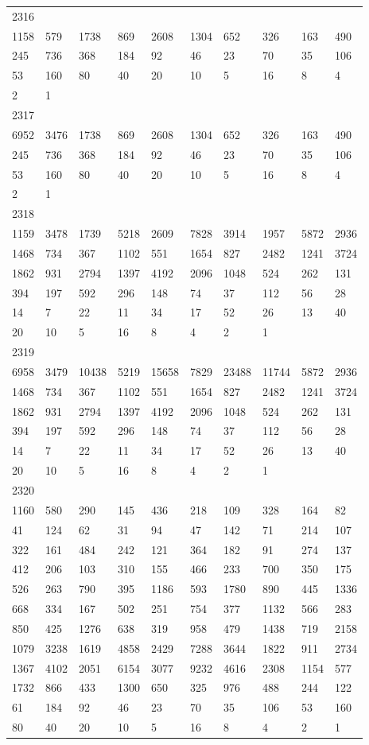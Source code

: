\begin{longtable}{*{10}{l}}
2316&&&&&&&&&\\
1158& 579& 1738& 869& 2608& 1304& 652& 326& 163& 490\\
245& 736& 368& 184& 92& 46& 23& 70& 35& 106\\
53& 160& 80& 40& 20& 10& 5& 16& 8& 4\\
2& 1& \\

2317&&&&&&&&&\\
6952& 3476& 1738& 869& 2608& 1304& 652& 326& 163& 490\\
245& 736& 368& 184& 92& 46& 23& 70& 35& 106\\
53& 160& 80& 40& 20& 10& 5& 16& 8& 4\\
2& 1& \\

2318&&&&&&&&&\\
1159& 3478& 1739& 5218& 2609& 7828& 3914& 1957& 5872& 2936\\
1468& 734& 367& 1102& 551& 1654& 827& 2482& 1241& 3724\\
1862& 931& 2794& 1397& 4192& 2096& 1048& 524& 262& 131\\
394& 197& 592& 296& 148& 74& 37& 112& 56& 28\\
14& 7& 22& 11& 34& 17& 52& 26& 13& 40\\
20& 10& 5& 16& 8& 4& 2& 1& \\

2319&&&&&&&&&\\
6958& 3479& 10438& 5219& 15658& 7829& 23488& 11744& 5872& 2936\\
1468& 734& 367& 1102& 551& 1654& 827& 2482& 1241& 3724\\
1862& 931& 2794& 1397& 4192& 2096& 1048& 524& 262& 131\\
394& 197& 592& 296& 148& 74& 37& 112& 56& 28\\
14& 7& 22& 11& 34& 17& 52& 26& 13& 40\\
20& 10& 5& 16& 8& 4& 2& 1& \\

2320&&&&&&&&&\\
1160& 580& 290& 145& 436& 218& 109& 328& 164& 82\\
41& 124& 62& 31& 94& 47& 142& 71& 214& 107\\
322& 161& 484& 242& 121& 364& 182& 91& 274& 137\\
412& 206& 103& 310& 155& 466& 233& 700& 350& 175\\
526& 263& 790& 395& 1186& 593& 1780& 890& 445& 1336\\
668& 334& 167& 502& 251& 754& 377& 1132& 566& 283\\
850& 425& 1276& 638& 319& 958& 479& 1438& 719& 2158\\
1079& 3238& 1619& 4858& 2429& 7288& 3644& 1822& 911& 2734\\
1367& 4102& 2051& 6154& 3077& 9232& 4616& 2308& 1154& 577\\
1732& 866& 433& 1300& 650& 325& 976& 488& 244& 122\\
61& 184& 92& 46& 23& 70& 35& 106& 53& 160\\
80& 40& 20& 10& 5& 16& 8& 4& 2& 1\\


\end{longtable}
